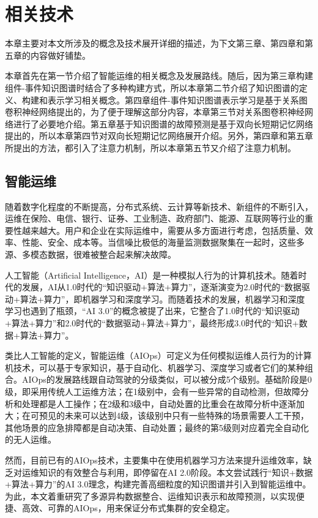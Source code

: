 \chapter{相关技术}
本章主要对本文所涉及的概念及技术展开详细的描述，为下文第三章、第四章和第五章的内容做好铺垫。

本章首先在第一节介绍了智能运维的相关概念及发展路线。随后，因为第三章构建组件-事件知识图谱时结合了多种构建方式，所以本章第二节介绍了知识图谱的定义、构建和表示学习相关概念。第四章组件-事件知识图谱表示学习是基于关系图卷积神经网络提出的，为了便于理解这部分内容，本章第三节对关系图卷积神经网络进行了必要地介绍。第五章基于知识图谱的故障预测是基于双向长短期记忆网络提出的，所以本章第四节对双向长短期记忆网络展开介绍。另外，第四章和第五章所提出的方法，都引入了注意力机制，所以本章第五节又介绍了注意力机制。
\section{智能运维}
随着数字化程度的不断提高，分布式系统、云计算等新技术、新组件的不断引入，运维在保险、电信、银行、证券、工业制造、政府部门、能源、互联网等行业的重要性越来越大。用户和企业在实际运维中，需要从多方面进行考虑，包括质量、效率、性能、安全、成本等。当信噪比极低的海量监测数据聚集在一起时，这些多源、多模态数据，很难被整合起来解决故障。

人工智能（Artificial Intelligence，AI）是一种模拟人行为的计算机技术。随着时代的发展，AI从1.0时代的“知识驱动+算法+算力”，逐渐演变为2.0时代的“数据驱动+算法+算力”，即机器学习和深度学习。而随着技术的发展，机器学习和深度学习也遇到了瓶颈，“AI 3.0”的概念被提了出来\cite{ai30}，它整合了1.0时代的“知识驱动+算法+算力”和2.0时代的“数据驱动+算法+算力”，最终形成3.0时代的“知识+数据+算法+算力”。

类比人工智能的定义，智能运维（AIOps）可定义为任何模拟运维人员行为的计算机技术，可以基于专家知识，基于自动化、机器学习、深度学习或者它们的某种组合。AIOps的发展路线跟自动驾驶的分级类似，可以被分成5个级别。基础阶段是0级，即采用传统人工运维方法；在1级别中，会有一些异常的自动检测，但故障分析和处理都是人工操作；在2级和3级中，自动处置的比重会在故障分析中逐渐加大；在可预见的未来可以达到4级，该级别中只有一些特殊的场景需要人工干预，其他场景的应急排障都是自动决策、自动处置；最终的第5级则对应着完全自动化的无人运维。

然而，目前已有的AIOps技术，主要集中在使用机器学习方法来提升运维效率，缺乏对运维知识的有效整合与利用，即停留在AI 2.0阶段。本文尝试践行“知识+数据+算法+算力”的AI 3.0理念，构建完善高细粒度的知识图谱并引入到智能运维中。为此，本文着重研究了多源异构数据整合、运维知识表示和故障预测，以实现便捷、高效、可靠的AIOps，用来保证分布式集群的安全稳定。

